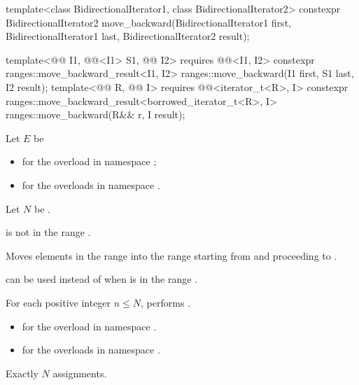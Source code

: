 %
\begin{itemdecl}
template<class BidirectionalIterator1, class BidirectionalIterator2>
  constexpr BidirectionalIterator2
    move_backward(BidirectionalIterator1 first, BidirectionalIterator1 last,
                  BidirectionalIterator2 result);

template<@@ I1, @@<I1> S1, @@ I2>
  requires @@<I1, I2>
  constexpr ranges::move_backward_result<I1, I2>
    ranges::move_backward(I1 first, S1 last, I2 result);
template<@@ R, @@ I>
  requires @@<iterator_t<R>, I>
  constexpr ranges::move_backward_result<borrowed_iterator_t<R>, I>
    ranges::move_backward(R&& r, I result);
\end{itemdecl}

\begin{itemdescr}
\pnum
Let $E$ be
\begin{itemize}
\item
  for the overload in namespace ;
\item
  for the overloads in namespace .
\end{itemize}
Let $N$ be .

\pnum
\expects
{} is not in the range .

\pnum
\effects
Moves elements in the range 
into the range 
starting from  and proceeding to .
\begin{footnote}
 can be used instead of 
when  is in the range .
\end{footnote}
For each positive integer $n \le N$,
performs .

\pnum
\returns
\begin{itemize}
\item
  for the overload in namespace .
\item
  for the overloads in namespace .
\end{itemize}

\pnum
\complexity
Exactly $N$ assignments.
\end{itemdescr}

